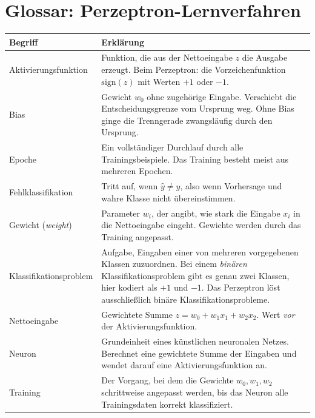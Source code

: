 \documentclass[ngerman,11pt]{article}
\begin{document}
\newpage


\section*{Glossar: Perzeptron-Lernverfahren}

\begin{center}
\begin{tabular}{|>{\raggedright\arraybackslash}p{4.2cm}|>{\raggedright\arraybackslash}p{10.8cm}|}
\hline
\textbf{Begriff} & \textbf{Erklärung} \\
\hline
Aktivierungsfunktion & Funktion, die aus der Nettoeingabe $z$ die Ausgabe erzeugt. Beim Perzeptron: die Vorzeichenfunktion $\text{sign}(z)$ mit Werten $+1$ oder $-1$. \\
\hline
Bias & Gewicht $w_0$ ohne zugehörige Eingabe. Verschiebt die Entscheidungsgrenze vom Ursprung weg. Ohne Bias ginge die Trenngerade zwangsläufig durch den Ursprung. \\
\hline
Epoche & Ein vollständiger Durchlauf durch alle Trainingsbeispiele. Das Training besteht meist aus mehreren Epochen. \\
\hline
Fehlklassifikation & Tritt auf, wenn $\hat{y} \neq y$, also wenn Vorhersage und wahre Klasse nicht übereinstimmen. \\
\hline
Gewicht (\emph{weight}) & Parameter $w_i$, der angibt, wie stark die Eingabe $x_i$ in die Nettoeingabe eingeht. Gewichte werden durch das Training angepasst. \\
\hline
Klassifikationsproblem & Aufgabe, Eingaben einer von mehreren vorgegebenen Klassen zuzuordnen. Bei einem \emph{binären} Klassifikationsproblem gibt es genau zwei Klassen, hier kodiert als $+1$ und $-1$. Das Perzeptron löst ausschließlich binäre Klassifikationsprobleme. \\
\hline
Nettoeingabe & Gewichtete Summe $z = w_0 + w_1 x_1 + w_2 x_2$. Wert \emph{vor} der Aktivierungsfunktion. \\
\hline
Neuron & Grundeinheit eines künstlichen neuronalen Netzes. Berechnet eine gewichtete Summe der Eingaben und wendet darauf eine Aktivierungsfunktion an. \\
\hline
Training & Der Vorgang, bei dem die Gewichte $w_0, w_1, w_2$ schrittweise angepasst werden, bis das Neuron alle Trainingsdaten korrekt klassifiziert. \\

\end{tabular}
\end{center}
\end{document}
